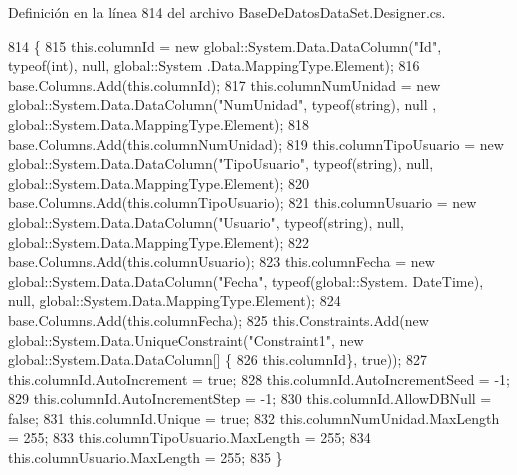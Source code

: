 Definición en la línea 814 del archivo Base\-De\-Datos\-Data\-Set.\-Designer.\-cs.


\begin{DoxyCode}
814                                      \{
815                 this.columnId = \textcolor{keyword}{new} global::System.Data.DataColumn(\textcolor{stringliteral}{"Id"}, typeof(\textcolor{keywordtype}{int}), null, global::System
      .Data.MappingType.Element);
816                 base.Columns.Add(this.columnId);
817                 this.columnNumUnidad = \textcolor{keyword}{new} global::System.Data.DataColumn(\textcolor{stringliteral}{"NumUnidad"}, typeof(\textcolor{keywordtype}{string}), null
      , global::System.Data.MappingType.Element);
818                 base.Columns.Add(this.columnNumUnidad);
819                 this.columnTipoUsuario = \textcolor{keyword}{new} global::System.Data.DataColumn(\textcolor{stringliteral}{"TipoUsuario"}, typeof(\textcolor{keywordtype}{string}), 
      null, global::System.Data.MappingType.Element);
820                 base.Columns.Add(this.columnTipoUsuario);
821                 this.columnUsuario = \textcolor{keyword}{new} global::System.Data.DataColumn(\textcolor{stringliteral}{"Usuario"}, typeof(\textcolor{keywordtype}{string}), null, 
      global::System.Data.MappingType.Element);
822                 base.Columns.Add(this.columnUsuario);
823                 this.columnFecha = \textcolor{keyword}{new} global::System.Data.DataColumn(\textcolor{stringliteral}{"Fecha"}, typeof(global::System.
      DateTime), null, global::System.Data.MappingType.Element);
824                 base.Columns.Add(this.columnFecha);
825                 this.Constraints.Add(\textcolor{keyword}{new} global::System.Data.UniqueConstraint(\textcolor{stringliteral}{"Constraint1"}, \textcolor{keyword}{new} 
      global::System.Data.DataColumn[] \{
826                                 this.columnId\}, \textcolor{keyword}{true}));
827                 this.columnId.AutoIncrement = \textcolor{keyword}{true};
828                 this.columnId.AutoIncrementSeed = -1;
829                 this.columnId.AutoIncrementStep = -1;
830                 this.columnId.AllowDBNull = \textcolor{keyword}{false};
831                 this.columnId.Unique = \textcolor{keyword}{true};
832                 this.columnNumUnidad.MaxLength = 255;
833                 this.columnTipoUsuario.MaxLength = 255;
834                 this.columnUsuario.MaxLength = 255;
835             \}
\end{DoxyCode}
